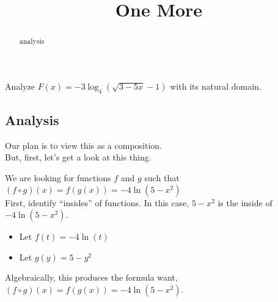 \documentclass{ximera}
\title{One More}
\begin{document}
\begin{abstract}
analysis
\end{abstract}
\maketitle












Analyze $F(x) = -3 \log_4(\sqrt{3 - 5x} - 1)$ with its natural domain. \\




\subsection*{Analysis}





Our plan is to view this as a composition. \\



But, first, let's get a look at this thing. \\



\begin{center}
\end{center}









We are looking for functions $f$ and $g$ such that $(f \circ g)(x) = f(g(x)) = -4 \ln(5 - x^2)$ \\


First, identify ``insides'' of functions.  In this case, $5 - x^2$ is the inside of $-4 \ln(5 - x^2)$. \\



\begin{itemize}
\item Let $f(t) = -4 \ln(t)$ \\
\item Let $g(y) = 5 - y^2$ \\
\end{itemize}

Algebraically, this produces the formula want, $(f \circ g)(x) = f(g(x)) = -4 \ln(5 - x^2)$.
\end{document}
